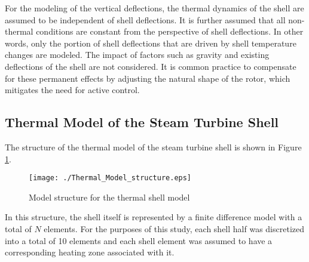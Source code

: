 \documentclass[a4paper, 10pt, conference]{ieeeconf}      %
\begin{document}
For the modeling of the vertical deflections, the thermal dynamics of the shell are assumed to be independent of shell deflections. It is further assumed that all non-thermal conditions are constant from the perspective of shell deflections. In other words, only the portion of shell deflections that are driven by shell temperature changes are modeled. The impact of factors such as gravity and existing deflections of the shell are not considered. It is common practice to compensate for these permanent effects by adjusting the natural shape of the rotor, which mitigates the need for active control.

\subsection{Thermal Model of the Steam Turbine Shell\label{sub:Thermal-Model}}

The structure of the thermal model of the steam turbine shell is shown
in Figure \ref{fig:Thermal-model-structure}.
\begin{figure}
\centering{}\texttt{[image: ./Thermal\_Model\_structure.eps]}\protect\caption{\label{fig:Thermal-model-structure} Model structure for the thermal
shell model}
\end{figure}
In this structure, the shell itself is represented by a finite difference
model with a total of $N$ elements. For the purposes of this study, each shell half was discretized into a total of 10 elements and each shell element was assumed to have a corresponding heating zone associated with it.
\end{document}
